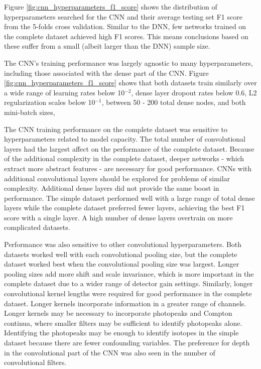 Figure \ref{fig:cnn_hyperparameters_f1_score} shows the distribution of hyperparameters searched for the CNN and their average testing set F1 score from the 5-folds cross validation. Similar to the DNN, few networks trained on the complete dataset achieved high F1 scores. This means conclusions based on these suffer from a small (albeit larger than the DNN) sample size.

The CNN's training performance was largely agnostic to many hyperparameters, including those associated with the dense part of the CNN. Figure \ref{fig:cnn_hyperparameters_f1_score} shows that both datasets train similarly over a wide range of learning rates below 10$^{-2}$, dense layer dropout rates below 0.6, L2 regularization scales below 10$^{-1}$, between 50 - 200 total dense nodes, and both mini-batch sizes, 

The CNN training performance on the complete dataset was sensitive to hyperparameters related to model capacity. The total number of convolutional layers had the largest affect on the performance of the complete dataset. Because of the additional complexity in the complete dataset, deeper networks - which extract more abstract features - are necessary for good performance. CNNs with additional convolutional layers should be explored for problems of similar complexity. Additional dense layers did not provide the same boost in performance. The simple dataset performed well with a large range of total dense layers while the complete dataset preferred fewer layers, achieving the best F1 score with a single layer. A high number of dense layers overtrain on more complicated datasets. 

Performance was also sensitive to other convolutional hyperparameters. Both datasets worked well with each convolutional pooling size, but the complete dataset worked best when the convolutional pooling size was largest. Longer pooling sizes add more shift and scale invariance, which is more important in the complete dataset due to a wider range of detector gain settings. Similarly, longer convolutional kernel lengths were required for good performance in the complete dataset. Longer kernels incorporate information in a greater range of channels. Longer kernels may be necessary to incorporate photopeaks and Compton continua, where smaller filters may be sufficient to identify photopeaks alone. Identifying the photopeaks may be enough to identify isotopes in the simple dataset because there are fewer confounding variables. The preference for depth in the convolutional part of the CNN was also seen in the number of convolutional filters.

